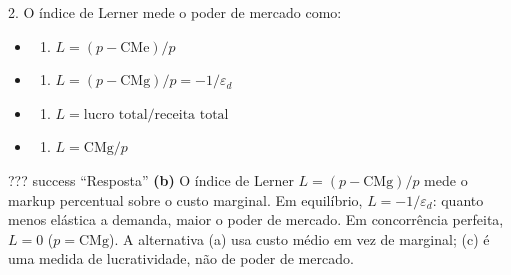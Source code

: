 \documentclass[11pt,twoside,openright]{book}
\providecommand{\tightlist}{\setlength{\itemsep}{0pt}\setlength{\parskip}{0pt}}
\begin{document}
\begin{infobox}{2. O índice de Lerner mede o poder de mercado como:}

\begin{itemize}
\tightlist
\item
  \begin{enumerate}
  \def\labelenumi{(\alph{enumi})}
  \tightlist
  \item
    \(L = (p - \text{CMe})/p\)
  \end{enumerate}
\item
  \begin{enumerate}
  \def\labelenumi{(\alph{enumi})}
  \setcounter{enumi}{1}
  \tightlist
  \item
    \(L = (p - \text{CMg})/p = -1/\varepsilon_d\)
  \end{enumerate}
\item
  \begin{enumerate}
  \def\labelenumi{(\alph{enumi})}
  \setcounter{enumi}{2}
  \tightlist
  \item
    \(L = \text{lucro total}/\text{receita total}\)
  \end{enumerate}
\item
  \begin{enumerate}
  \def\labelenumi{(\alph{enumi})}
  \setcounter{enumi}{3}
  \tightlist
  \item
    \(L = \text{CMg}/p\)
  \end{enumerate}
\end{itemize}

??? success ``Resposta'' \textbf{(b)} O índice de Lerner
\(L = (p - \text{CMg})/p\) mede o markup percentual sobre o custo
marginal. Em equilíbrio, \(L = -1/\varepsilon_d\): quanto menos elástica
a demanda, maior o poder de mercado. Em concorrência perfeita, \(L = 0\)
(\(p = \text{CMg}\)). A alternativa (a) usa custo médio em vez de
marginal; (c) é uma medida de lucratividade, não de poder de mercado.

\end{infobox}
\end{document}
